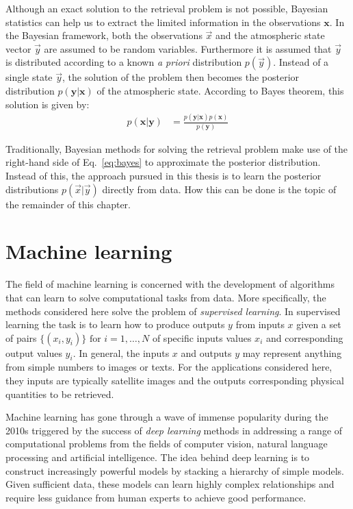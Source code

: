 Although an exact solution to the retrieval problem is not possible, Bayesian
statistics can help us to extract the limited information in the observations
$\mathbf{x}$. In the Bayesian framework, both the observations $\vec{x}$ and the
atmospheric state vector $\vec{y}$ are assumed to be random variables.
Furthermore it is assumed that $\vec{y}$ is distributed according to a
known \textit{a priori} distribution $p(\vec{y})$. Instead of a single state
$\vec{y}$, the solution of the problem then becomes the posterior distribution
$p(\mathbf{y} | \mathbf{x})$ of the atmospheric state. According to Bayes
theorem, this solution is given by:
\begin{align}\label{eq:bayes}
  p(\mathbf{x} | \mathbf{y}) &= \frac{p(\mathbf{y}|\mathbf{x})
  p(\mathbf{x})}{p(\mathbf{y})}
\end{align}

Traditionally, Bayesian methods for solving the retrieval problem make use of
the right-hand side of Eq.~\ref{eq:bayes} to approximate the posterior
distribution. Instead of this, the approach pursued in this thesis is to learn
the posterior distributions $p(\vec{x}|\vec{y})$ directly from data. How this
can be done is the topic of the remainder of this chapter.

\section{Machine learning}


The field of machine learning is concerned with the development of algorithms
that can learn to solve computational tasks from data. More specifically, the
methods considered here solve the problem of \textit{supervised learning}. In
supervised learning the task is to learn how to produce outputs $y$ from
inputs $x$ given a set of pairs $\{(x_i, y_i)\}\text{ for }i = 1, \ldots, N$ of
specific inputs values $x_i$ and corresponding output values $y_i$. In general,
the inputs $x$ and outputs $y$ may represent anything from simple numbers to
images or texts. For the applications considered here, they inputs are typically
satellite images and the outputs corresponding physical quantities to be
retrieved.%

Machine learning has gone through a wave of immense popularity during the 2010s
triggered by the success of \textit{deep learning} methods in addressing a range
of computational problems from the fields of computer vision, natural language
processing and artificial intelligence. The idea behind deep learning is to
construct increasingly powerful models by stacking a hierarchy of simple models.
Given sufficient data, these models can learn highly complex relationships and
require less guidance from human experts to achieve good performance.

